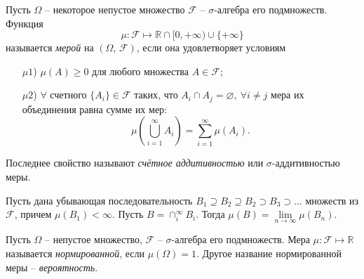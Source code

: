 \begin{to_def}
    Пусть $\Omega$ -- некоторое непустое множество $\mathcal F$ -- $\sigma$-алгебра его подмножеств. Функция
    \begin{equation*}
        \mu \colon  \mathcal F \mapsto \mathbb{R} \cap [0, +\infty) \cup \{+\infty\}
    \end{equation*}
    называется \textit{мерой} на $(\Omega, \, \mathcal F)$, если она удовлетворяет условиям
    \begin{itemize}
        \item[$\mu 1$)] $\mu(A) \geq 0$ для любого множества $A \in \mathcal F$;
        \item[$\mu 2$)] $\forall$ счетного $\{A_i\} \in \mathcal F$ таких, что $A_i \cap A_j = \varnothing, \ \forall i \neq j$ мера их объединения равна сумме их мер:
        \begin{equation*}
            \mu\left(
                \bigcup_{i=1}^{\infty} A_i
            \right) = \sum_{i=1}^{\infty} \mu (A_i).
        \end{equation*}
    \end{itemize}
\end{to_def}

Последнее свойство называют \textit{счётное аддитивностью} или $\sigma$-аддитивностью меры. 


\begin{to_thr}
    Пусть дана убывающая последовательность $B_1 \supseteq B_2 \supseteq B_2 \supset B_3 \supset \ldots$ множеств из $\mathcal F$, причем $\mu(B_1) < \infty$. Пусть $B = \cap_i^{\infty} B_i$. Тогда $\mu(B) = \lim\limits_{n\to\infty} \mu (B_n)$.
\end{to_thr}

\begin{to_def}
    Пусть $\Omega$ -- непустое множество, $\mathcal F$ -- $\sigma$-алгебра его подмножеств. Мера $\mu \colon  \mathcal F \mapsto \mathbb{R}$ называется \textit{нормированной}, если $\mu(\Omega)=1$. Другое название нормированной меры -- \textit{вероятность}. 
\end{to_def}

